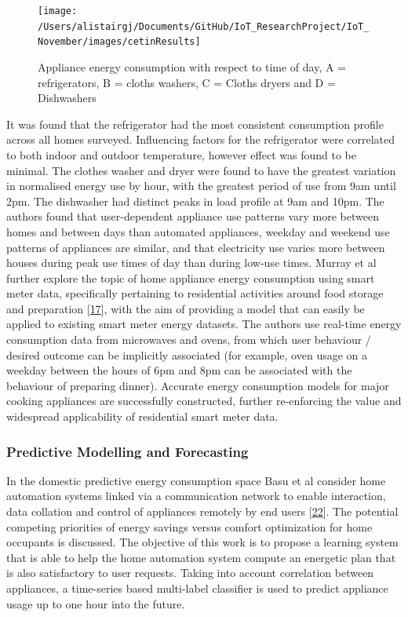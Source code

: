 \documentclass[11pt,]{article}
\begin{document}
\begin{figure}[H]

{\centering \texttt{[image: /Users/alistairgj/Documents/GitHub/IoT\_ResearchProject/IoT\_November/images/cetinResults]} 

}

\caption{Appliance energy consumption with respect to time of day, A = refrigerators, B = cloths washers, C = Cloths dryers and D = Dishwashers}\label{fig:unnamed-chunk-2}
\end{figure}

It was found that the refrigerator had the most consistent consumption
profile across all homes surveyed. Influencing factors for the
refrigerator were correlated to both indoor and outdoor temperature,
however effect was found to be minimal. The clothes washer and dryer
were found to have the greatest variation in normalised energy use by
hour, with the greatest period of use from 9am until 2pm. The dishwasher
had distinct peaks in load profile at 9am and 10pm. The authors found
that user-dependent appliance use patterns vary more between homes and
between days than automated appliances, weekday and weekend use patterns
of appliances are similar, and that electricity use varies more between
houses during peak use times of day than during low-use times. Murray et
al further explore the topic of home appliance energy consumption using
smart meter data, specifically pertaining to residential activities
around food storage and preparation
{[}\protect\hyperlink{ref-d.m.murrayApplianceElectricalConsumption2018}{17}{]},
with the aim of providing a model that can easily be applied to existing
smart meter energy datasets. The authors use real-time energy
consumption data from microwaves and ovens, from which user behaviour /
desired outcome can be implicitly associated (for example, oven usage on
a weekday between the hours of 6pm and 8pm can be associated with the
behaviour of preparing dinner). Accurate energy consumption models for
major cooking appliances are successfully constructed, further
re-enforcing the value and widespread applicability of residential smart
meter data.

\hypertarget{predictive-modelling-and-forecasting}{%
\subsubsection{Predictive Modelling and
Forecasting}\label{predictive-modelling-and-forecasting}}

In the domestic predictive energy consumption space Basu et al consider
home automation systems linked via a communication network to enable
interaction, data collation and control of appliances remotely by end
users
{[}\protect\hyperlink{ref-kaustavbasuApplianceUsagePrediction2012}{22}{]}.
The potential competing priorities of energy savings versus comfort
optimization for home occupants is discussed. The objective of this work
is to propose a learning system that is able to help the home automation
system compute an energetic plan that is also satisfactory to user
requests. Taking into account correlation between appliances, a
time-series based multi-label classifier is used to predict appliance
usage up to one hour into the future.
\end{document}

